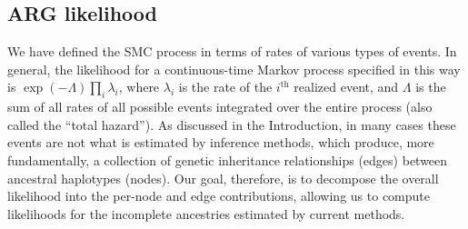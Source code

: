 \documentclass{article}
\newcommand{\comment}[1]{{\it \color{orange} (#1)}}
\begin{document}
\subsection*{ARG likelihood} \label{par:liks}
We have defined the SMC process in terms of rates of various types of events.
In general, the likelihood for a continuous-time Markov process specified in this way
is $\exp(-\Lambda) \prod_i \lambda_i$,
where $\lambda_i$ is the rate of the $i^\text{th}$ realized event,
and $\Lambda$ is the sum of all rates of all possible events
integrated over the entire process
(also called the ``total hazard''). 
As discussed in the Introduction, in many cases these events are not what is 
estimated by inference methods, which produce, more fundamentally, a collection
of genetic inheritance relationships (edges) between ancestral haplotypes (nodes).
Our goal, therefore, is to decompose the overall likelihood into the
per-node and edge contributions, allowing us to compute likelihoods
for the incomplete ancestries estimated by current methods.




\end{document}
